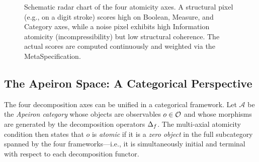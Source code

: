 \begin{figure}[htbp]
\centering
{}
\caption{Schematic radar chart of the four atomicity axes. A structural pixel (e.g., on a digit stroke) scores high on Boolean, Measure, and Category axes, while a noise pixel exhibits high Information atomicity (incompressibility) but low structural coherence. The actual scores are computed continuously and weighted via the MetaSpecification.}
\label{fig:radar}
\end{figure}

\subsection{The Apeiron Space: A Categorical Perspective}
\label{sec:apeiron_space}

The four decomposition axes can be unified in a categorical framework. Let $\mathcal{A}$ be the \emph{Apeiron category} whose objects are observables $o \in \mathcal{O}$ and whose morphisms are generated by the decomposition operators $\Delta_f$. The multi-axial atomicity condition then states that $o$ is \emph{atomic} if it is a \emph{zero object} in the full subcategory spanned by the four frameworks---i.e., it is simultaneously initial and terminal with respect to each decomposition functor.

